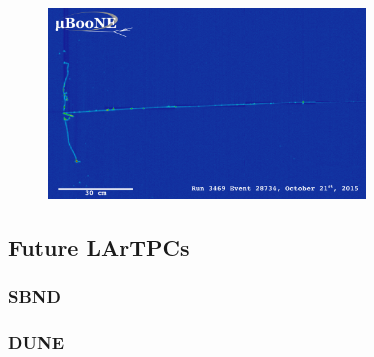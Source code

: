 \begin{figure}[h]
  \centering
  \includegraphics[width=0.75\textwidth]{lartpc_figures/run3469_subrun574_event28734_col_small.png}
  \caption[\uboone Run 3469, Event 28734]{}
  \label{fig:uboone_r3469_e28734}
\end{figure}


\subsection{\label{sec:future_tpcs} Future LArTPCs}





\subsubsection{\label{subsec:sbnd} SBND}


\subsubsection{\label{subsec:sbnd} \icarus}


\subsubsection{\label{subsec:dune} DUNE}

